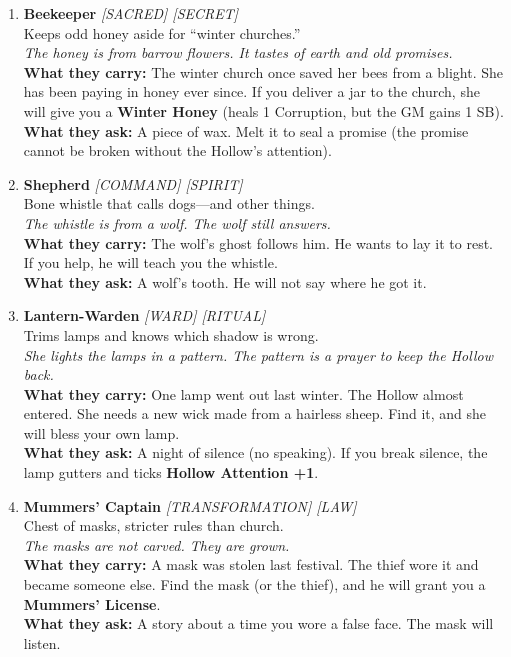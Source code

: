 \begin{enumerate}
\item \textbf{Beekeeper} \hfill \textit{[SACRED] [SECRET]} \\
  Keeps odd honey aside for ``winter churches.'' \\
  \textit{The honey is from barrow flowers. It tastes of earth and old promises.} \\
  \textbf{What they carry:} The winter church once saved her bees from a blight. She has been paying in honey ever since. If you deliver a jar to the church, she will give you a \textbf{Winter Honey} (heals 1 Corruption, but the GM gains 1 SB). \\
  \textbf{What they ask:} A piece of wax. Melt it to seal a promise (the promise cannot be broken without the Hollow's attention).

\item \textbf{Shepherd} \hfill \textit{[COMMAND] [SPIRIT]} \\
  Bone whistle that calls dogs---and other things. \\
  \textit{The whistle is from a wolf. The wolf still answers.} \\
  \textbf{What they carry:} The wolf's ghost follows him. He wants to lay it to rest. If you help, he will teach you the whistle. \\
  \textbf{What they ask:} A wolf's tooth. He will not say where he got it.

\item \textbf{Lantern-Warden} \hfill \textit{[WARD] [RITUAL]} \\
  Trims lamps and knows which shadow is wrong. \\
  \textit{She lights the lamps in a pattern. The pattern is a prayer to keep the Hollow back.} \\
  \textbf{What they carry:} One lamp went out last winter. The Hollow almost entered. She needs a new wick made from a hairless sheep. Find it, and she will bless your own lamp. \\
  \textbf{What they ask:} A night of silence (no speaking). If you break silence, the lamp gutters and ticks \textbf{Hollow Attention +1}.

\item \textbf{Mummers' Captain} \hfill \textit{[TRANSFORMATION] [LAW]} \\
  Chest of masks, stricter rules than church. \\
  \textit{The masks are not carved. They are grown.} \\
  \textbf{What they carry:} A mask was stolen last festival. The thief wore it and became someone else. Find the mask (or the thief), and he will grant you a \textbf{Mummers' License}. \\
  \textbf{What they ask:} A story about a time you wore a false face. The mask will listen.


\end{enumerate}
